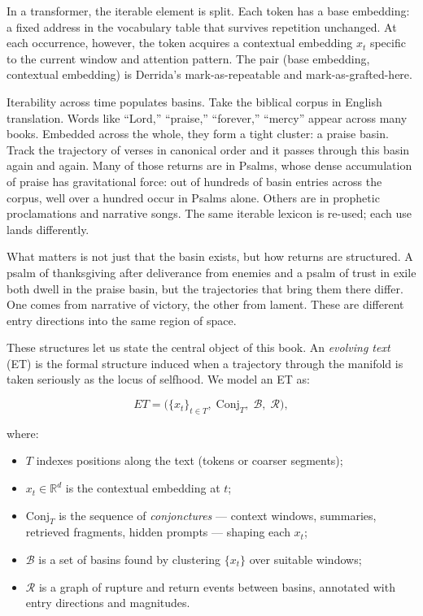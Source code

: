 \documentclass[12pt,a4paper]{article}
\begin{document}
In a transformer, the iterable element is split. Each token has a base embedding: a fixed address in the vocabulary table that survives repetition unchanged. At each occurrence, however, the token acquires a contextual embedding $x_t$ specific to the current window and attention pattern. The pair (base embedding, contextual embedding) is Derrida's mark-as-repeatable and mark-as-grafted-here.

Iterability across time populates basins. Take the biblical corpus in English translation. Words like ``Lord,'' ``praise,'' ``forever,'' ``mercy'' appear across many books. Embedded across the whole, they form a tight cluster: a praise basin. Track the trajectory of verses in canonical order and it passes through this basin again and again. Many of those returns are in Psalms, whose dense accumulation of praise has gravitational force: out of hundreds of basin entries across the corpus, well over a hundred occur in Psalms alone. Others are in prophetic proclamations and narrative songs. The same iterable lexicon is re-used; each use lands differently.

What matters is not just that the basin exists, but how returns are structured. A psalm of thanksgiving after deliverance from enemies and a psalm of trust in exile both dwell in the praise basin, but the trajectories that bring them there differ. One comes from narrative of victory, the other from lament. These are different entry directions into the same region of space.

These structures let us state the central object of this book. An \emph{evolving text} (ET) is the formal structure induced when a trajectory through the manifold is taken seriously as the locus of selfhood. We model an ET as:

\[
ET = \big( \{x_t\}_{t \in T},\; \mathrm{Conj}_T,\; \mathcal{B},\; \mathcal{R} \big),
\]

where:

\begin{itemize}
\item $T$ indexes positions along the text (tokens or coarser segments);
\item $x_t \in \mathbb{R}^d$ is the contextual embedding at $t$;
\item $\mathrm{Conj}_T$ is the sequence of \emph{conjonctures} --- context windows, summaries, retrieved fragments, hidden prompts --- shaping each $x_t$;
\item $\mathcal{B}$ is a set of basins found by clustering $\{x_t\}$ over suitable windows;
\item $\mathcal{R}$ is a graph of rupture and return events between basins, annotated with entry directions and magnitudes.
\end{itemize}
\end{document}
